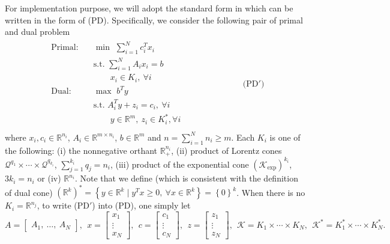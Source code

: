 \documentclass[10pt]{article}
\theoremstyle{definition}
\theoremstyle{plain}
\begin{document}
For implementation purpose, we will adopt the standard form in \cite{SDPT3_2010} which can be written in the form of (PD). Specifically, we consider the following pair of primal and dual problem
\begin{align*}
\begin{split}
\text{Primal:}\quad &\min\,\, \sum_{i=1}^N c_i^Tx_i\\
& \text{s.t.}\,\, \sum_{i=1}^N A_i x_i = b \\
&\quad\quad x_i \in K_i,\ \forall i \\[1ex] 
\text{Dual:} \quad &\max\,\, b^T y\\
& \text{s.t.}\,\, A_i^T y + z_i = c_i, \ \forall i \\
&\quad\quad y \in \mathbb{R}^m,\ z_i \in K_i^*, \forall i \\[1ex]
\end{split} \quad\quad\quad\quad\quad\quad\quad \text{(PD$'$)}
\end{align*}
where $x_i, c_i \in \mathbb{R}^{n_i}$, $A_i \in \mathbb{R}^{m\times n_i}$, $b \in \mathbb{R}^m$ and $n = \sum_{i=1}^N n_i \geq m$. Each $K_i$ is one of the following: (i) the nonnegative orthant $\mathbb{R}_+^{n_i}$, (ii) product of Lorentz cones $\mathcal{Q}^{q_1}\times \cdots \times \mathcal{Q}^{q_{k_i}}$, $\sum_{j=1}^{k_i} q_j = n_i$, (iii) product of the exponential cone  $\left(\mathcal{K}_{\exp}\right)^{k_i}$, $3k_i = n_i$ or (iv) $\mathbb{R}^{n_i}$. Note that we define (which is consistent with the definition of dual cone) $\left(\mathbb{R}^k\right)^* = \left\{ y \in \mathbb{R}^k \mid y^T x \geq 0,\ \forall x \in \mathbb{R}^k  \right\} = \left\{0\right\}^k$. When there is no $K_i = \mathbb{R}^{n_j}$, to write (PD$'$) into (PD), one simply let
\[  A = \begin{bmatrix} A_1,\ \hdots,\  A_N \end{bmatrix},\ \
x = \begin{bmatrix} x_1 \\ \vdots\\ x_N \end{bmatrix},\ \ 
c = \begin{bmatrix} c_1 \\ \vdots \\c_N \end{bmatrix},\ \
z = \begin{bmatrix} z_1 \\ \vdots \\ z_N \end{bmatrix},\ \ \mathcal{K} = K_1 \times \cdots \times K_N,\ \ \mathcal{K}^* = K_1^* \times \cdots \times K_N^*.\]
\end{document}
